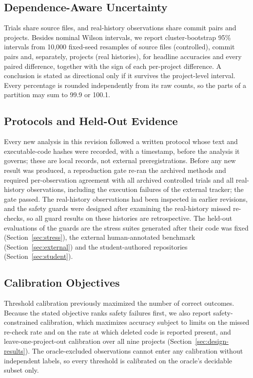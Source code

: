 \subsection{Dependence-Aware Uncertainty}
Trials share source files, and real-history observations share commit pairs and projects. Besides nominal Wilson intervals, we report cluster-bootstrap 95\% intervals from 10,000 fixed-seed resamples of source files (controlled), commit pairs and, separately, projects (real histories), for headline accuracies and every paired difference, together with the sign of each per-project difference. A conclusion is stated as directional only if it survives the project-level interval. Every percentage is rounded independently from its raw counts, so the parts of a partition may sum to 99.9 or 100.1.

\subsection{Protocols and Held-Out Evidence}
Every new analysis in this revision followed a written protocol whose text and executable-code hashes were recorded, with a timestamp, before the analysis it governs; these are local records, not external preregistrations. Before any new result was produced, a reproduction gate re-ran the archived methods and required per-observation agreement with all \nTrialsAll{} archived controlled trials and all \smRealCasAccN{} real-history observations, including the \smRealTrkExecFail{} execution failures of the external tracker; the gate passed. The real-history observations had been inspected in earlier revisions, and the safety guards were designed after examining the real-history missed re-checks, so all guard results on these histories are retrospective. The held-out evaluations of the guards are the stress suites generated after their code was fixed (Section~\ref{sec:stress}), the external human-annotated benchmark (Section~\ref{sec:external}) and the student-authored repositories (Section~\ref{sec:student}).

\subsection{Calibration Objectives}
Threshold calibration previously maximized the number of correct outcomes. Because the stated objective ranks safety failures first, we also report safety-constrained calibration, which maximizes accuracy subject to limits on the missed re-check rate and on the rate at which deleted code is reported present, and leave-one-project-out calibration over all nine projects (Section~\ref{sec:design-results}). The oracle-excluded observations cannot enter any calibration without independent labels, so every threshold is calibrated on the oracle's decidable subset only.
